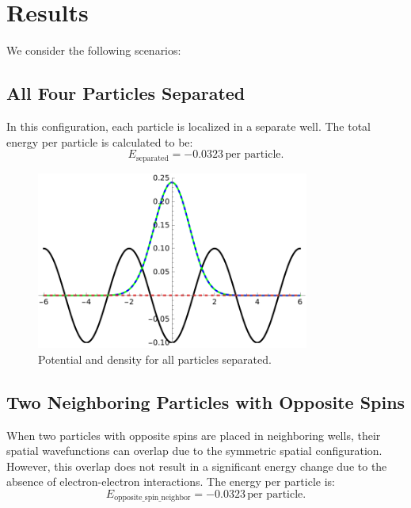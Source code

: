 \documentclass[11pt]{article}
\begin{document}
\section{Results}

We consider the following scenarios:

\subsection{All Four Particles Separated}
In this configuration, each particle is localized in a separate well. The total energy per particle is calculated to be:
\begin{equation}
E_\text{separated} = -0.0323 \, \text{per particle}.
\end{equation}

\begin{figure}[h]
    \centering
    \includegraphics[width=0.8\textwidth]{IMGseparated.pdf}
    \caption{Potential and density for all particles separated.}
    \label{fig:separated}
\end{figure}

\subsection{Two Neighboring Particles with Opposite Spins}
When two particles with opposite spins are placed in neighboring wells, their spatial wavefunctions can overlap due to the symmetric spatial configuration. However, this overlap does not result in a significant energy change due to the absence of electron-electron interactions. The energy per particle is:
\begin{equation}
E_\text{opposite\_spin\_neighbor} = -0.0323 \, \text{per particle}.
\end{equation}
\end{document}
